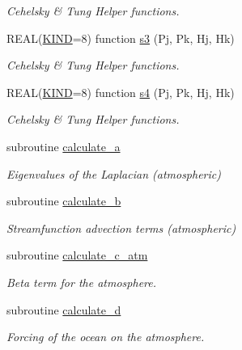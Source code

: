 \begin{DoxyCompactItemize}
\begin{DoxyCompactList}\small\item\em Cehelsky \& Tung Helper functions. \end{DoxyCompactList}\item 
R\-E\-A\-L(\hyperlink{LICENSE_8txt_a8e1a82be600178fe97c0e1339897c260}{K\-I\-N\-D}=8) function \hyperlink{classinprod__analytic_a98f667849ef41e348fbab50a30b23911}{s3} (Pj, Pk, Hj, Hk)
\begin{DoxyCompactList}\small\item\em Cehelsky \& Tung Helper functions. \end{DoxyCompactList}\item 
R\-E\-A\-L(\hyperlink{LICENSE_8txt_a8e1a82be600178fe97c0e1339897c260}{K\-I\-N\-D}=8) function \hyperlink{classinprod__analytic_a94e9a36caf648c9b3eea675fc7f3c0e2}{s4} (Pj, Pk, Hj, Hk)
\begin{DoxyCompactList}\small\item\em Cehelsky \& Tung Helper functions. \end{DoxyCompactList}\item 
subroutine \hyperlink{classinprod__analytic_a9a003ced8e18bf5299c05dc76a8b1e47}{calculate\-\_\-a}
\begin{DoxyCompactList}\small\item\em Eigenvalues of the Laplacian (atmospheric) \end{DoxyCompactList}\item 
subroutine \hyperlink{classinprod__analytic_ab2db39e602d165af9d709d712ebf1b1d}{calculate\-\_\-b}
\begin{DoxyCompactList}\small\item\em Streamfunction advection terms (atmospheric) \end{DoxyCompactList}\item 
subroutine \hyperlink{classinprod__analytic_afa4abc3665e4628bda2deb421c123e05}{calculate\-\_\-c\-\_\-atm}
\begin{DoxyCompactList}\small\item\em Beta term for the atmosphere. \end{DoxyCompactList}\item 
subroutine \hyperlink{classinprod__analytic_a1b0c41711a02f385766aeef2faf22830}{calculate\-\_\-d}
\begin{DoxyCompactList}\small\item\em Forcing of the ocean on the atmosphere. \end{DoxyCompactList}\item 

\end{DoxyCompactItemize}
